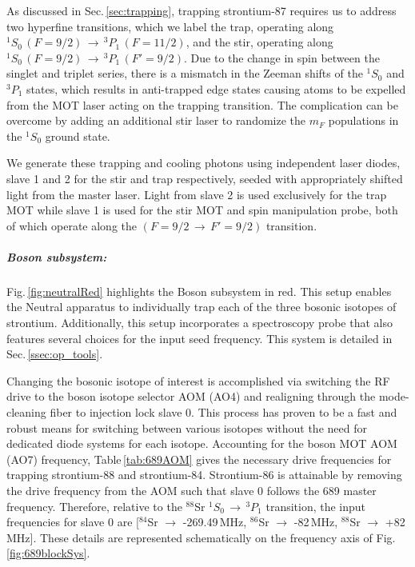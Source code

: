 As discussed in Sec.\,\ref{sec:trapping}, trapping strontium-87 requires us to address two hyperfine transitions, which we label the trap, operating along $^1S_0\,(F=9/2)\,\rightarrow\,^3P_1\,(F=11/2)$, and the stir, operating along $^1S_0\,(F=9/2)\,\rightarrow\,^3P_1\,(F'=9/2)$.
Due to the change in spin between the singlet and triplet series, there is a mismatch in the Zeeman shifts of the $^1S_0$ and $^3P_1$ states, which results in anti-trapped edge states causing atoms to be expelled from the MOT laser acting on the trapping transition.
The complication can be overcome by adding an additional stir laser to randomize the $m_F$ populations in the $^1S_0$ ground state.

We generate these trapping and cooling photons using independent laser diodes, slave 1 and 2 for the stir and trap respectively, seeded with appropriately shifted light from the master laser.
Light from slave 2 is used exclusively for the trap MOT while slave 1 is used for the stir MOT and spin manipulation probe, both of which operate along the $(F=9/2\,\rightarrow\,F'=9/2)$ transition.

\subparagraph{Boson subsystem:}
Fig.\,\ref{fig:neutralRed} highlights the Boson subsystem in red.
This setup enables the Neutral apparatus to individually trap each of the three bosonic isotopes of strontium.
Additionally, this setup incorporates a spectroscopy probe that also features several choices for the input seed frequency. 
This system is detailed in Sec.\,\ref{ssec:op_tools}.

Changing the bosonic isotope of interest is accomplished via switching the RF drive to the boson isotope selector AOM (AO4) and realigning through the mode-cleaning fiber to injection lock slave 0.
This process has proven to be a fast and robust means for switching between various isotopes without the need for dedicated diode systems for each isotope.
Accounting for the boson MOT AOM (AO7) frequency, Table\,\ref{tab:689AOM} gives the necessary drive frequencies for trapping strontium-88 and strontium-84.
Strontium-86 is attainable by removing the drive frequency from the AOM such that slave 0 follows the 689 master frequency.
Therefore, relative to the $^{88}$Sr $^1S_0\,\rightarrow\,^3P_1$ transition, the input frequencies for slave 0 are [$^{84}$Sr $\rightarrow$ -269.49\,MHz, $^{86}$Sr $\rightarrow$ -82\,MHz, $^{88}$Sr $\rightarrow$ +82\,MHz].
These details are represented schematically on the frequency axis of Fig.\,\ref{fig:689blockSys}.
	
